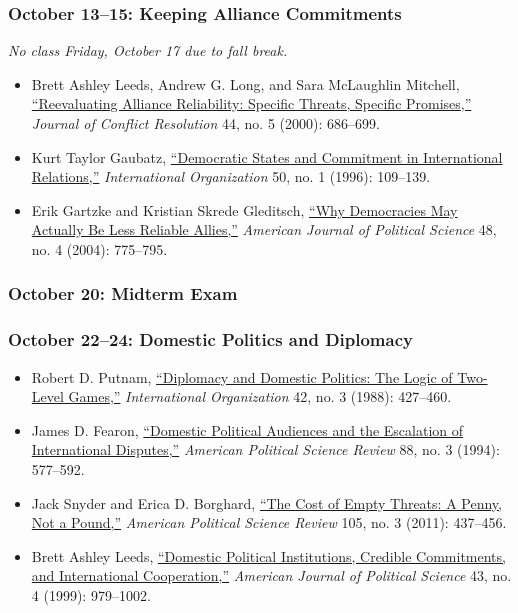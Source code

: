 \subsubsection{October 13--15: Keeping Alliance
Commitments}\label{october-1315-keeping-alliance-commitments}

\emph{No class Friday, October 17 due to fall break.}

\begin{itemize}
\item
  Brett Ashley Leeds, Andrew G. Long, and Sara McLaughlin Mitchell,
  \href{http://www.jstor.org/stable/174649}{``Reevaluating Alliance
  Reliability: Specific Threats, Specific Promises,''} \emph{Journal of
  Conflict Resolution} 44, no. 5 (2000): 686--699.
\item
  Kurt Taylor Gaubatz,
  \href{http://www.jstor.org/stable/2707000}{``Democratic States and
  Commitment in International Relations,''} \emph{International
  Organization} 50, no. 1 (1996): 109--139.
\item
  Erik Gartzke and Kristian Skrede Gleditsch,
  \href{http://www.jstor.org/stable/1519933}{``Why Democracies May
  Actually Be Less Reliable Allies,''} \emph{American Journal of
  Political Science} 48, no. 4 (2004): 775--795.
\end{itemize}

\subsubsection{October 20: Midterm Exam}\label{october-20-midterm-exam}

\subsubsection{October 22--24: Domestic Politics and
Diplomacy}\label{october-2224-domestic-politics-and-diplomacy}

\begin{itemize}
\item
  Robert D. Putnam,
  \href{http://www.jstor.org/stable/2706785}{``Diplomacy and Domestic
  Politics: The Logic of Two-Level Games,''} \emph{International
  Organization} 42, no. 3 (1988): 427--460.
\item
  James D. Fearon, \href{http://www.jstor.org/stable/2944796}{``Domestic
  Political Audiences and the Escalation of International Disputes,''}
  \emph{American Political Science Review} 88, no. 3 (1994): 577--592.
\item
  Jack Snyder and Erica D. Borghard,
  \href{http://dx.doi.org/10.1017/S000305541100027X}{``The Cost of Empty
  Threats: A Penny, Not a Pound,''} \emph{American Political Science
  Review} 105, no. 3 (2011): 437--456.
\item
  Brett Ashley Leeds,
  \href{http://www.jstor.org/stable/2991814}{``Domestic Political
  Institutions, Credible Commitments, and International Cooperation,''}
  \emph{American Journal of Political Science} 43, no. 4 (1999):
  979--1002.
\end{itemize}

